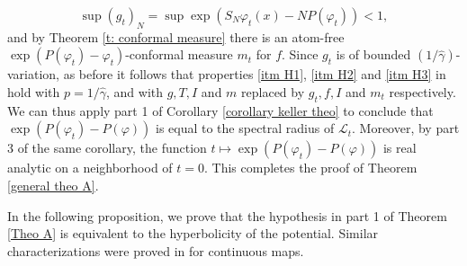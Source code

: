 \documentclass[10pt,a4paper]{amsart}
\numberwithin{equation}{section} %
\numberwithin{figure}{section} %
\renewcommand{\=}{\coloneqq}
\begin{document}
\begin{equation*}\sup (g_t)_N = \sup \exp(S_N \varphi_t(x) - NP(\varphi_t))<1,
\end{equation*}
and by Theorem \ref{t: conformal measure} there is an atom-free $\exp(P(\varphi_t)-\varphi_t)$-conformal measure $m_t$ for $f$. Since $g_t$ is of bounded $(1/\widehat{\gamma})$-variation, as before it follows that properties \ref{itm H1}, \ref{itm H2} and \ref{itm H3} in  hold with $p=1/\widehat{\gamma}$, and with $g,T,I$ and $m$ replaced by $g_t,f,I$ and $m_t$ respectively. We can thus apply part 1 of Corollary \ref{corollary keller theo} to conclude that $\exp(P(\varphi_t)-P(\varphi))$ is equal to the spectral radius of $\mathscr{L}_t$. Moreover, by part 3 of the same corollary, the function $t\mapsto \exp(P(\varphi_t)-P(\varphi))$ is real analytic on a neighborhood of $t=0$. This completes the proof of Theorem \ref{general theo A}.
\endproof

In the following proposition, we prove that the hypothesis in part 1 of Theorem \ref{Theo A} is equivalent to the hyperbolicity of the potential. Similar characterizations were proved in \cite{InoquioRivera} for continuous maps.
\end{document}
